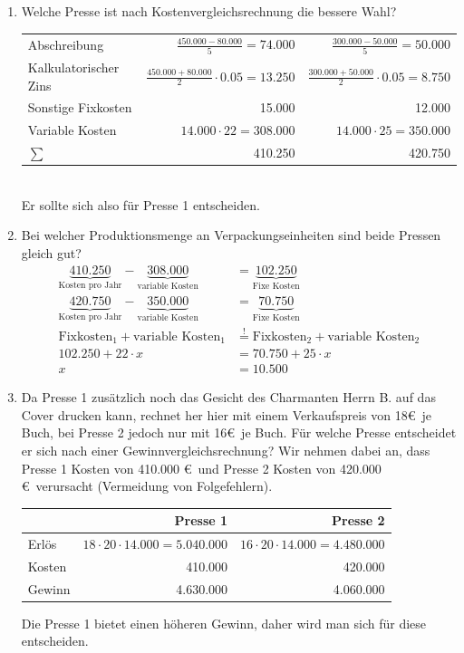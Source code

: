 \documentclass[11pt, a4paper]{article}
\begin{document}
\begin{enumerate}
	\item Welche Presse ist nach Kostenvergleichsrechnung die bessere Wahl? \\
		\begin{tabular}{lr|r}
			Abschreibung & $\frac{450.000 - 80.000}{5} = 74.000$ & $\frac{300.000 - 50.000}{5} = 50.000$ \\
			Kalkulatorischer Zins & $\frac{450.000 + 80.000}{2} \cdot 0.05 = 13.250$ & $\frac{300.000 + 50.000}{2} \cdot 0.05 = 8.750$ \\
			Sonstige Fixkosten & 15.000 & 12.000 \\
			Variable Kosten & $14.000 \cdot 22 = 308.000$ & $14.000 \cdot 25 = 350.000$ \\ \hline
			$\sum$ & 410.250 & 420.750
		\end{tabular}
		\vspace{\baselineskip} \\
		Er sollte sich also für Presse 1 entscheiden.
	\item Bei welcher Produktionsmenge an Verpackungseinheiten sind beide Pressen gleich gut?
		\begin{align*}
		\underbrace{410.250}_{\text{Kosten pro Jahr}} - \underbrace{308.000}_{\text{variable Kosten}} &= \underbrace{102.250}_{\text{Fixe Kosten}} \tag{Maschine 1} \\
		\underbrace{420.750}_{\text{Kosten pro Jahr}} - \underbrace{350.000}_{\text{variable Kosten}} &= \underbrace{70.750}_{\text{Fixe Kosten}} \tag{Maschine 2} \\
		\text{Fixkosten}_1 + \text{variable Kosten}_1 &\overset{!}{=} \text{Fixkosten}_2 + \text{variable Kosten}_2 \\
		102.250 + 22 \cdot x &= 70.750 + 25 \cdot x \\
		x &= 10.500
		\end{align*}
	\item Da Presse 1 zusätzlich noch das Gesicht des Charmanten Herrn B. auf das Cover drucken kann, rechnet her hier mit einem Verkaufspreis von 18\euro \ je Buch, bei Presse 2 jedoch nur mit 16\euro \ je Buch. Für welche Presse entscheidet er sich nach einer Gewinnvergleichsrechnung? Wir nehmen dabei an, dass Presse 1 Kosten von 410.000 \euro \ und Presse 2 Kosten von 420.000 \euro \ verursacht (Vermeidung von Folgefehlern).
	
		\vspace{\baselineskip}
		\begin{tabular}{l|r|r}
			& Presse 1 & Presse 2 \\ \hline
			Erlös & $18 \cdot 20 \cdot 14.000 =5.040.000$ & $16 \cdot 20 \cdot 14.000 = 4.480.000$ \\
			Kosten & 410.000 & 420.000 \\ \hline
			Gewinn & 4.630.000 & 4.060.000
		\end{tabular}
		
		\vspace{\baselineskip}
		Die Presse 1 bietet einen höheren Gewinn, daher wird man sich für diese entscheiden.
\end{enumerate}
\end{document}
